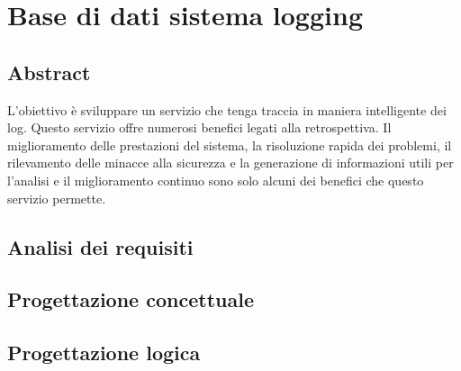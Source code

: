\section{Base di dati sistema logging}

\subsection{Abstract}

L’obiettivo è sviluppare un servizio che tenga traccia in maniera intelligente dei log. Questo servizio offre numerosi benefici legati alla retrospettiva. Il miglioramento delle prestazioni del sistema, la risoluzione rapida dei problemi, il rilevamento delle minacce alla sicurezza e la generazione di informazioni utili per l'analisi e il miglioramento continuo sono solo alcuni dei benefici che questo servizio permette.

\subsection{Analisi dei requisiti}

\subsection{Progettazione concettuale}

\subsection{Progettazione logica}
